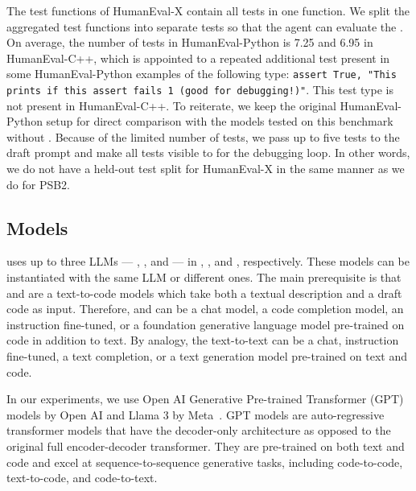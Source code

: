 The test functions of HumanEval-X contain all tests in one function. We split the aggregated test functions into separate tests so that the \rank{} agent can evaluate the . 
On average, the number of tests in HumanEval-Python is 7.25 and 6.95 in HumanEval-C++, which is appointed to a repeated additional test present in some HumanEval-Python examples of the following type: \texttt{assert True, "This prints if this assert fails 1 (good for debugging!)"}.
This test type is not present in HumanEval-C++.
To reiterate, we keep the original HumanEval-Python setup for direct comparison with the models tested on this benchmark without \method{}. 
Because of the limited number of tests, we pass up to five tests to the draft prompt and make all tests visible to \method{} for the debugging loop. 
In other words, we do not have a held-out test split for HumanEval-X in the same manner as we do for PSB2.


\subsection{Models}
\label{sec:seidr-models}

\method{} uses up to three LLMs --- \synthmodelnoargs{}, \textmodelnoargs{}, and \debugmodelnoargs{} ---
in \synthesize{}, \instructllm{}, and \debug{}, respectively. 
These models can be instantiated with the same LLM or different ones. 
The main prerequisite is that \synthmodelnoargs{} and \debugmodelnoargs{} are a text-to-code models which take both a textual description and a draft code as input.
Therefore, \synthmodelnoargs{} and \debugmodelnoargs{} can be a chat model, a code completion model, an instruction fine-tuned, or a foundation generative language model pre-trained on code in addition to text. 
By analogy, the text-to-text \textmodelnoargs{} can be a chat, instruction fine-tuned, a text completion, or a text generation model pre-trained on text and code.

In our experiments, we use Open AI Generative Pre-trained Transformer (GPT) models by Open AI and Llama 3 by Meta~\cite{roziere2023:code}. 
GPT models are auto-regressive transformer models that have the decoder-only architecture as opposed to the original full encoder-decoder transformer.
They are pre-trained on both text and code and excel at sequence-to-sequence generative tasks, including code-to-code, text-to-code, and code-to-text.

